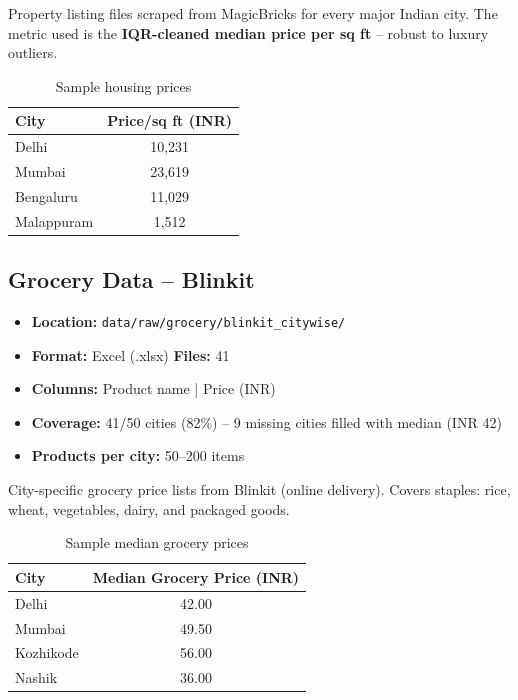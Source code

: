\documentclass[12pt,a4paper]{article}
\begin{document}
Property listing files scraped from MagicBricks for every major Indian city. The metric used
is the \textbf{IQR-cleaned median price per sq ft} -- robust to luxury outliers.

\begin{table}[H]
  \centering
  \begin{tabular}{lc}
    \toprule
    \textbf{City} & \textbf{Price/sq ft (INR)} \\
    \midrule
    Delhi      & 10,231 \\
    Mumbai     & 23,619 \\
    Bengaluru  & 11,029 \\
    Malappuram &  1,512 \\
    \bottomrule
  \end{tabular}
  \caption{Sample housing prices}
\end{table}

\subsection{Grocery Data -- Blinkit}

\begin{itemize}[leftmargin=*]
  \item \textbf{Location:} \texttt{data/raw/grocery/blinkit\_citywise/}
  \item \textbf{Format:} Excel (.xlsx) \quad \textbf{Files:} 41
  \item \textbf{Columns:} Product name | Price (INR)
  \item \textbf{Coverage:} 41/50 cities (82\%) -- 9 missing cities filled with median (INR 42)
  \item \textbf{Products per city:} 50--200 items
\end{itemize}

City-specific grocery price lists from Blinkit (online delivery). Covers staples: rice, wheat,
vegetables, dairy, and packaged goods.

\begin{table}[H]
  \centering
  \begin{tabular}{lc}
    \toprule
    \textbf{City} & \textbf{Median Grocery Price (INR)} \\
    \midrule
    Delhi     & 42.00 \\
    Mumbai    & 49.50 \\
    Kozhikode & 56.00 \\
    Nashik    & 36.00 \\
    \bottomrule
  \end{tabular}
  \caption{Sample median grocery prices}
\end{table}
\end{document}

